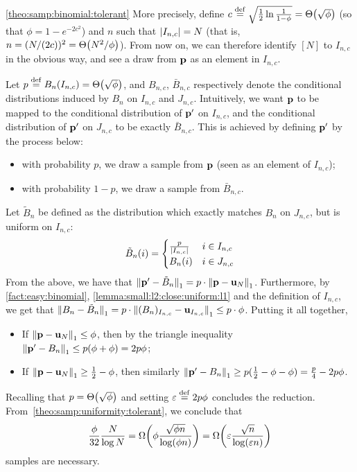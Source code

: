 \begin{proofof}{\cref{theo:samp:binomial:tolerant}}
More precisely, define $c\eqdef \sqrt{\frac{1}{2}\ln\frac{1}{1-\phi}} =\bigTheta{\sqrt{\phi}}$ (so that $\phi = 1 - e^{-2c^2}$) and $n$ such that $\left\lvert I_{n,c} \right\rvert= N$ (that is, $n=(N/(2c))^2 = \bigTheta{N^2/\phi}$). From now on, we can therefore identify $[N]$ to $I_{n,c}$ in the obvious way, and see a draw from $\mathbf{p}$ as an element in $I_{n,c}$.

Let $p\eqdef B_n(I_{n,c}) = \bigTheta{\sqrt{\phi}}$, and $B_{n,c}$, $\bar{B}_{n,c}$ respectively denote the conditional distributions induced by $B_n$ on $I_{n,c}$ and $J_{n,c}$. Intuitively, we want $\mathbf{p}$ to be mapped to the conditional distribution of $\mathbf{p}^\prime$ on $I_{n,c}$, and the conditional distribution of $\mathbf{p}^\prime$ on $J_{n,c}$ to be exactly $\bar{B}_{n,c}$. This is achieved by defining $\mathbf{p}^\prime$ by the process below:
\begin{itemize}
  \item with probability $p$, we draw a sample from $\mathbf{p}$ (seen as an element of $I_{n,c}$);
  \item with probability $1-p$, we draw a sample from $\bar{B}_{n,c}$.
\end{itemize}
Let $\tilde{B}_n$ be defined as the distribution which exactly matches $B_n$ on $J_{n,c}$, but is uniform on $I_{n,c}$:
\begin{align*}
  \tilde{B}_n(i) = \begin{cases}
    \frac{p}{\left\lvert I_{n,c} \right\rvert} & i\in I_{n,c}\\
    B_n(i) & i\in J_{n,c}\\
     \end{cases}
\end{align*}
From the above, we have that ${\lVert\mathbf{p}^\prime - \tilde{B}_n{\rVert}}_1 = p\cdot {\lVert\ensuremath{\mathbf{p}}- \ensuremath{\mathbf{u}}_N{\rVert}}_1$. Furthermore, by \cref{fact:easy:binomial}, \cref{lemma:small:l2:close:uniform:l1} and the definition of $I_{n,c}$, we get that ${\lVert B_n - \tilde{B}_n{\rVert}}_1 = p\cdot {\lVert(B_n)_{I_{n,c}} - \ensuremath{\mathbf{u}}_{I_{n,c}}{\rVert}}_1 \leq p\cdot \phi$. Putting it all together,

\begin{itemize}
  \item If ${\lVert\mathbf{p} - \mathbf{u}_N{\rVert}}_1 \leq \phi$, then by the triangle inequality ${\lVert\mathbf{p}^\prime - B_n{\rVert}}_1 \leq p(\phi + \phi) = 2p\phi$;
  \item If ${\lVert\mathbf{p} - \mathbf{u}_N{\rVert}}_1 \geq \frac{1}{2}-\phi$, then similarly ${\lVert\mathbf{p}^\prime - B_n{\rVert}}_1 \geq p(\frac{1}{2}-\phi -\phi) = \frac{p}{4}-2p\phi$.
\end{itemize}
Recalling that $p= \bigTheta{\sqrt{\phi}}$ and setting $\varepsilon \stackrel{\rm def}{=} 2p\phi$ concludes the reduction. From~\cref{theo:samp:uniformity:tolerant}, we conclude that
\[
\frac{\phi}{32}\frac{N}{\log N}
  = \bigOmega{\phi\frac{\sqrt{\phi n}}{\log(\phi n)}} 
  = \bigOmega{\eps\frac{\sqrt{n}}{\log(\eps n)}}
\]
samples are necessary.
\end{proofof}
